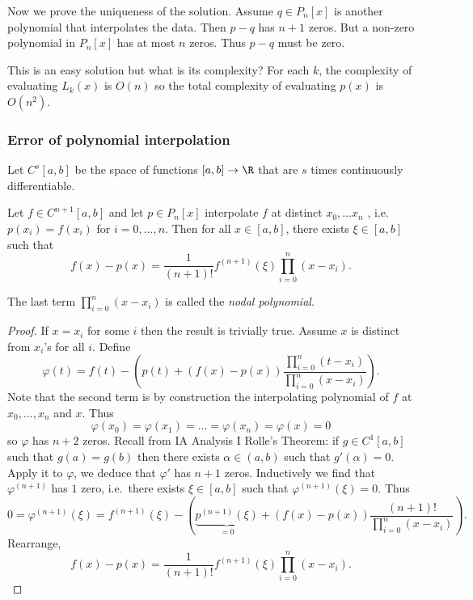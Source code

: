 \documentclass[a4paper]{article}
\begin{document}
Now we prove the uniqueness of the solution. Assume \(q \in P_n[x]\) is another polynomial that interpolates the data. Then \(p - q\) has \(n + 1\) zeros. But a non-zero polynomial in \(P_n[x]\) has at most \(n\) zeros. Thus \(p - q\) must be zero.

This is an easy solution but what is its complexity? For each \(k\), the complexity of evaluating \(L_k(x)\) is \(O(n)\) so the total complexity of evaluating \(p(x)\) is \(O(n^2)\).

\subsubsection{Error of polynomial interpolation}

Let \(C^s[a, b]\) be the space of functions \([a, b] \to \R\) that are \(s\) times continuously differentiable.

\begin{theorem}
  Let \(f \in C^{n + 1}[a, b]\) and let \(p \in P_n[x]\) interpolate \(f\) at distinct \(x_0, \dots x_n\) , i.e.\ \(p(x_i) = f(x_i)\) for \(i = 0, \dots, n\). Then for all \(x \in [a, b]\), there exists \(\xi \in [a, b]\) such that
  \[
    f(x) - p(x) = \frac{1}{(n + 1)!} f^{(n + 1)}(\xi) \prod_{i = 0}^n (x - x_i).
  \]
\end{theorem}

The last term \(\prod_{i = 0}^n (x - x_i)\) is called the \emph{nodal polynomial}.

\begin{proof}
  If \(x = x_i\) for some \(i\) then the result is trivially true. Assume \(x\) is distinct from \(x_i\)'s for all \(i\). Define
  \[
    \varphi(t) = f(t) - \left(p(t) + (f(x) - p(x)) \frac{\prod_{i = 0}^n(t - x_i)}{\prod_{i = 0}^n(x - x_i)} \right).
  \]
  Note that the second term is by construction the interpolating polynomial of \(f\) at \(x_0, \dots, x_n\) and \(x\). Thus
  \[
    \varphi(x_0) = \varphi(x_1) = \dots = \varphi(x_n) = \varphi(x) = 0
  \]
  so \(\varphi\) has \(n + 2\) zeros. Recall from IA Analysis I Rolle's Theorem: if \(g \in C^1[a, b]\) such that \(g(a) = g(b)\) then there exists \(\alpha \in (a, b)\) such that \(g'(\alpha) = 0\). Apply it to \(\varphi\), we deduce that \(\varphi'\) has \(n + 1\) zeros. Inductively we find that \(\varphi^{(n + 1)}\) has \(1\) zero, i.e.\ there exists \(\xi \in [a, b]\) such that \(\varphi^{(n + 1)}(\xi) = 0\). Thus
  \[
    0 = \varphi^{(n + 1)}(\xi) = f^{(n + 1)}(\xi) - \left( \underbrace{p^{(n + 1)}(\xi)}_{= 0} + (f(x) - p(x)) \frac{(n + 1)!}{\prod_{i = 0}^n(x - x_i)} \right).
  \]
  Rearrange,
  \[
    f(x) - p(x) = \frac{1}{(n + 1)!}f^{(n + 1)}(\xi) \prod_{i = 0}^n(x - x_i).
  \]
\end{proof}
\end{document}

